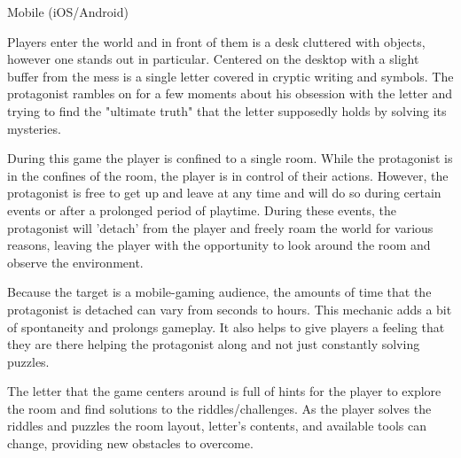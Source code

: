\documentclass[archE1,portrait]{baposter}
\begin{document}
\begin{poster}
{ 
	Mobile (iOS/Android)
}


{
	\quad  Players enter the world and in front of them is a desk cluttered with objects, however one stands out in particular. Centered on the desktop with a slight buffer from the mess is a single letter covered in cryptic writing and symbols. The protagonist rambles on for a few moments about his obsession with the letter and trying to find the "ultimate truth" that the letter supposedly holds by solving its mysteries.
}


{
	\quad During this game the player is confined to a single room. While the protagonist is in the confines of the room, the player is in control of their actions. However, the protagonist is free to get up and leave at any time and will do so during certain events or after a prolonged period of playtime. During these events, the protagonist will 'detach' from the player and freely roam the world for various reasons, leaving the player with the opportunity to look around the room and observe the environment. 
	
	\quad Because the target is a mobile-gaming audience, the amounts of time that the protagonist is detached can vary from seconds to hours. This mechanic adds a bit of spontaneity and prolongs gameplay. It also helps to give players a feeling that they are there helping the protagonist along and not just constantly solving puzzles.
	
	\quad The letter that the game centers around is full of hints for the player to explore the room and find solutions to the riddles/challenges. As the player solves the riddles and puzzles the room layout, letter's contents, and available tools can change, providing new obstacles to overcome.
	
}
\end{poster}
\end{document}
